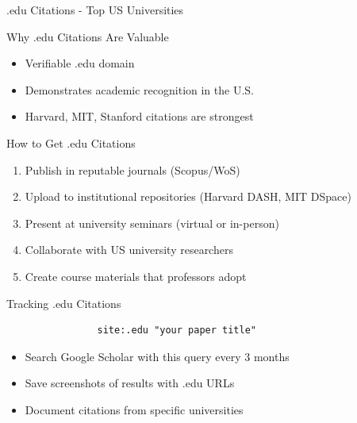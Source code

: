 \documentclass[11pt]{beamer}
\begin{document}
	\begin{frame}{.edu Citations - Top US Universities}
		\scriptsize
		\begin{block}{Why .edu Citations Are Valuable}
			\begin{itemize}
				\item Verifiable .edu domain
				\item Demonstrates academic recognition in the U.S.
				\item Harvard, MIT, Stanford citations are strongest
			\end{itemize}
		\end{block}
		\begin{block}{How to Get .edu Citations}
			\begin{enumerate}
				\item Publish in reputable journals (Scopus/WoS)
				\item Upload to institutional repositories (Harvard DASH, MIT DSpace)
				\item Present at university seminars (virtual or in-person)
				\item Collaborate with US university researchers
				\item Create course materials that professors adopt
			\end{enumerate}
		\end{block}
		\begin{block}{Tracking .edu Citations}
			\begin{verbatim}
				site:.edu "your paper title"
			\end{verbatim}
			\begin{itemize}
				\item Search Google Scholar with this query every 3 months
				\item Save screenshots of results with .edu URLs
				\item Document citations from specific universities
			\end{itemize}
		\end{block}
	\end{frame}
	
\end{document}
